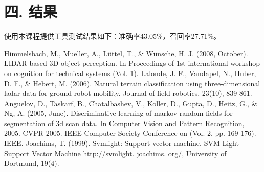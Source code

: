 \documentclass[12pt]{article}
\begin{document}
  \section*{四. 结果}
  	使用本课程提供工具测试结果如下：准确率43.05\%，召回率27.71\%。
  \begin{thebibliography}{3}
 	Himmelsbach, M., Mueller, A., Lüttel, T., \& Wünsche, H. J. (2008, October). LIDAR-based 3D object perception. In Proceedings of 1st international workshop on cognition for technical systems (Vol. 1).
  	Lalonde, J. F., Vandapel, N., Huber, D. F., \& Hebert, M. (2006). Natural terrain classification using three‐dimensional ladar data for ground robot mobility. Journal of field robotics, 23(10), 839-861.
  	Anguelov, D., Taskarf, B., Chatalbashev, V., Koller, D., Gupta, D., Heitz, G., \& Ng, A. (2005, June). Discriminative learning of markov random fields for segmentation of 3d scan data. In Computer Vision and Pattern Recognition, 2005. CVPR 2005. IEEE Computer Society Conference on (Vol. 2, pp. 169-176). IEEE.
  	Joachims, T. (1999). Svmlight: Support vector machine. SVM-Light Support Vector Machine http://svmlight. joachims. org/, University of Dortmund, 19(4).
  \end{thebibliography}
 
\end{document}
